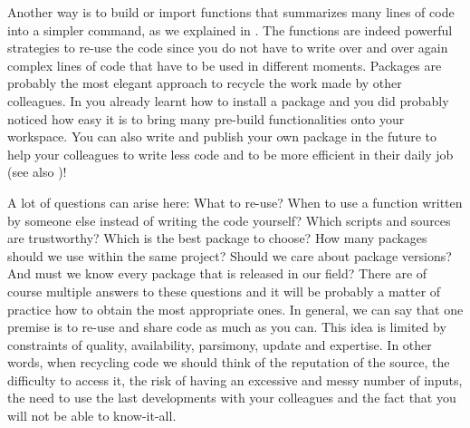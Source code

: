 Another way is to build or import functions that summarizes many lines of code into a simpler command, as we explained in . The functions are indeed powerful strategies to re-use the code since you do not have to write over and over again complex lines of code that have to be used in different moments. Packages are probably the most elegant approach to recycle the work made by other colleagues. In  you already learnt how to install a package and you did probably noticed how easy it is to bring many pre-build functionalities onto your workspace. You can also write and publish your own package in the future to help your colleagues to write less code and to be more efficient in their daily job (see also )!

A lot of questions can arise here: What to re-use? When to use a function written by someone else instead of writing the code yourself? Which scripts and sources are trustworthy? Which is the best package to choose? How many packages should we use within the same project? Should we care about package versions? And must we know every package that is released in our field? There are of course multiple answers to these questions and it will be probably a matter of practice how to obtain the most appropriate ones. In general, we can say that one premise is to re-use and share code as much as you can. This idea is limited by constraints of quality, availability, parsimony, update and expertise. In other words, when recycling code we should think of the reputation of the source, the difficulty to access it, the risk of having an excessive and messy number of inputs, the need to use the last developments with your colleagues and the fact that you will not be able to know-it-all.

